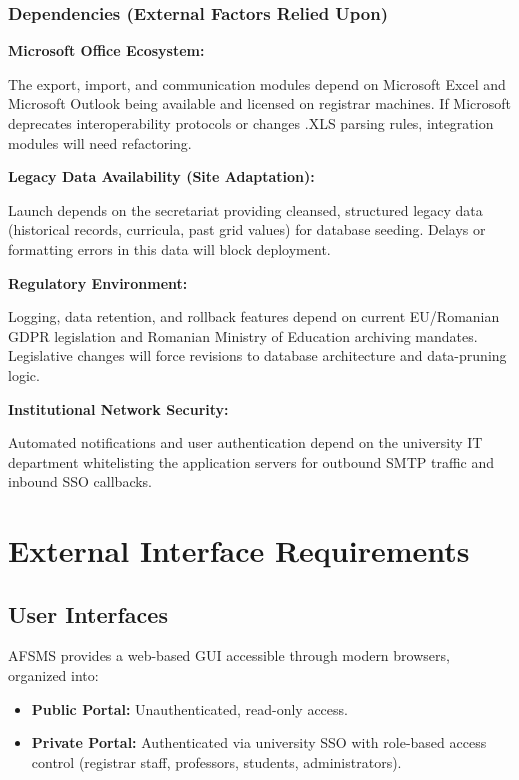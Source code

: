 \documentclass[11pt, a4paper]{article}
\begin{document}
\subsubsection{Dependencies (External Factors Relied Upon)}

\textbf{Microsoft Office Ecosystem:}

The export, import, and communication modules depend on Microsoft Excel and Microsoft Outlook being available and licensed on registrar machines. If Microsoft deprecates interoperability protocols or changes .XLS parsing rules, integration modules will need refactoring.

\textbf{Legacy Data Availability (Site Adaptation):}

Launch depends on the secretariat providing cleansed, structured legacy data (historical records, curricula, past grid values) for database seeding. Delays or formatting errors in this data will block deployment.

\textbf{Regulatory Environment:}

Logging, data retention, and rollback features depend on current EU/Romanian GDPR legislation and Romanian Ministry of Education archiving mandates. Legislative changes will force revisions to database architecture and data-pruning logic.

\textbf{Institutional Network Security:}

Automated notifications and user authentication depend on the university IT department whitelisting the application servers for outbound SMTP traffic and inbound SSO callbacks.


\section{External Interface Requirements}

\subsection{User Interfaces}
AFSMS provides a web-based GUI accessible through modern browsers, organized into:
\begin{itemize}
    \item \textbf{Public Portal:} Unauthenticated, read-only access.
    \item \textbf{Private Portal:} Authenticated via university SSO with role-based access control (registrar staff, professors, students, administrators).
\end{itemize}
\end{document}
